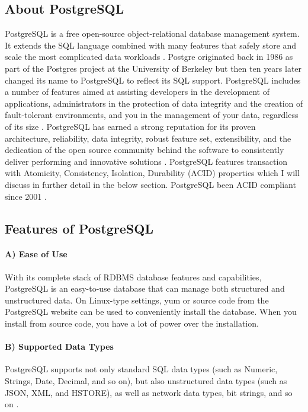 \subsection{About PostgreSQL}
PostgreSQL is a free open-source object-relational database management system. It extends the SQL language combined with many features that safely store and scale the most complicated data workloads \cite{vainikka2018full}. Postgre originated back in 1986 as part of the Postgres project at the University of Berkeley but then ten years later changed its name to PostgreSQL to reflect its SQL support. PostgreSQL includes a number of features aimed at assisting developers in the development of applications, administrators in the protection of data integrity and the creation of fault-tolerant environments, and you in the management of your data, regardless of its size \cite{PostgreSQL}. PostgreSQL has earned a strong reputation for its proven architecture, reliability, data integrity, robust feature set, extensibility, and the dedication of the open source community behind the software to consistently deliver performing and innovative solutions \cite{PostgreSQL}. PostgreSQL features transaction with  Atomicity, Consistency, Isolation, Durability (ACID) properties which I will discuss in further detail in the below section. PostgreSQL been ACID compliant since 2001 .

\subsection{Features of PostgreSQL}

\paragraph{A) Ease of Use}
With its complete stack of RDBMS database features and capabilities, PostgreSQL is an easy-to-use database that can manage both structured and unstructured data. On Linux-type settings, yum or source code from the PostgreSQL website can be used to conveniently install the database. When you install from source code, you have a lot of power over the installation. 

\paragraph{B) Supported Data Types}
PostgreSQL supports not only standard SQL data types (such as Numeric, Strings, Date, Decimal, and so on), but also unstructured data types (such as JSON, XML, and HSTORE), as well as network data types, bit strings, and so on \cite{PostgreFeatures}. 

